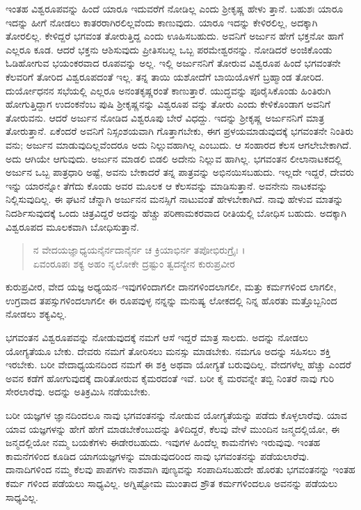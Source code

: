 ಇಂತಹ ವಿಶ್ವರೂಪವನ್ನು ಹಿಂದೆ ಯಾರೂ ಇದುವರೆಗೆ ನೋಡಿಲ್ಲ ಎಂದು ಶ್ರೀಕೃಷ್ಣ ಹೇಳು ತ್ತಾನೆ. ಬಹುಶಃ ಯಾರೂ ಇದನ್ನು ಹೀಗೆ ನೋಡಲು ಕಾತರರಾಗಿರಲಿಲ್ಲವೆಂದು ಕಾಣುವುದು. ಯಾರೂ ಇದನ್ನು ಕೇಳಿರಲಿಲ್ಲ, ಅದಕ್ಕಾಗಿ ತೋರಲಿಲ್ಲ. ಕೇಳಿದ್ದರೆ ಭಗವಂತ ತೋರುತ್ತಿದ್ದ ಎಂದು ಊಹಿಸಬಹುದು. ಅವನಿಗೆ ಅರ್ಜುನ ಹೇಗೆ ಭಕ್ತನೋ ಹಾಗೆ ಎಲ್ಲರೂ ಕೂಡ. ಆದರೆ ಭಕ್ತನು ಆಶಿಸುವುದು ಪ್ರೀತಿಸಬಲ್ಲ ಒಬ್ಬ ಪರಮೇಶ್ವರನನ್ನು. ನೋಡಿದರೆ ಅಂಜಿಕೊಂಡು ಓಡಿಹೋಗುವ ಭಯಂಕರವಾದ ರೂಪವನ್ನು ಅಲ್ಲ. ಇಲ್ಲಿ ಅರ್ಜುನನಿಗೆ ತೋರುವ ವಿಶ್ವರೂಪ ಹಿಂದೆ ಭಗವಂತನೇ ಕೆಲವರಿಗೆ ತೋರಿದ ವಿಶ್ವರೂಪದಂತೆ ಇಲ್ಲ. ತನ್ನ ತಾಯಿ ಯಶೋದೆಗೆ ಬಾಯಿಯೊಳಗೆ ಬ್ರಹ್ಮಾಂಡ ತೋರಿದ. ದುರ್ಯೋಧನನ ಸಭೆಯಲ್ಲಿ ಎಲ್ಲರೂ ಅನಂತಕೃಷ್ಣರಂತೆ ಕಾಣುತ್ತಾರೆ. ಯುದ್ಧವನ್ನು ಪೂರೈಸಿಕೊಂಡು ಹಿಂತಿರುಗಿ ಹೋಗುತ್ತಿದ್ದಾಗ ಉದಂಕನೆಂಬ ಪುಷಿ ಶ್ರೀಕೃಷ್ಣನನ್ನು ವಿಶ್ವರೂಪ ವನ್ನು ತೋರು ಎಂದು ಕೇಳಿಕೊಂಡಾಗ ಅವನಿಗೆ ತೋರುವನು. ಆದರೆ ಅರ್ಜುನ ನೋಡಿದ ವಿಶ್ವರೂಪು ಬೇರೆ ವಿಧದ್ದು. ಇದನ್ನು ಶ್ರೀಕೃಷ್ಣ ಅರ್ಜುನನಿಗೆ ಮಾತ್ರ ತೋರುತ್ತಾನೆ. ಏಕೆಂದರೆ ಅವನಿಗೆ ನಿಸ್ಸಂಶಯವಾಗಿ ಗೊತ್ತಾಗಬೇಕು, ಈಗ ಪ್ರಳಯಮಾಡುವುದಕ್ಕೆ ಭಗವಂತನೇ ನಿಂತಿರು ವನು; ಅರ್ಜುನ ಮಾಡುವುದಿಲ್ಲವೆಂದರೂ ಅದು ನಿಲ್ಲುವಹಾಗಿಲ್ಲ ಎಂಬುದು. ಆ ಸಂಹಾರದ ಕೆಲಸ ಆಗಲೇಬೇಕಾಗಿದೆ. ಅದು ಆಗಿಯೇ ಆಗುವುದು. ಅರ್ಜುನ ಮಾಡಲಿ ಬಿಡಲಿ ಅದೇನು ನಿಲ್ಲುವ ಹಾಗಿಲ್ಲ. ಭಗವಂತನ ಲೀಲಾನಾಟಕದಲ್ಲಿ ಅರ್ಜುನ ಒಬ್ಬ ಪಾತ್ರಧಾರಿ ಅಷ್ಟೆ, ಅವನು ಬೇಕಾದರೆ ತನ್ನ ಪಾತ್ರವನ್ನು ಅಭಿನಯಿಸಬಹುದು. ಇಲ್ಲದೇ ಇದ್ದರೆ, ದೇವರು ಇನ್ನು ಯಾರನ್ನೋ ತೆಗೆದು ಕೊಂಡು ಅವರ ಮೂಲಕ ಆ ಕೆಲಸವನ್ನು ಮಾಡಿಸುತ್ತಾನೆ. ಅವನೇನು ನಾಟಕವನ್ನು ನಿಲ್ಲಿಸುವುದಿಲ್ಲ. ಈ ಘಟನೆ ಚೆನ್ನಾಗಿ ಅರ್ಜುನನ ಮನಸ್ಸಿಗೆ ನಾಟುವಂತೆ ಹೇಳಬೇಕಾಗಿದೆ. ನಾವು ಹೇಳುವ ಮಾತನ್ನು ನಿದರ್ಶಿಸುವುದಕ್ಕೆ ಒಂದು ಚಿತ್ರವಿದ್ದರೆ ಅದನ್ನು ಹೆಚ್ಚು ಪರಿಣಾಮಕರವಾದ ರೀತಿಯಲ್ಲಿ ಬೋಧಿಸ ಬಹುದು. ಅದಕ್ಕಾಗಿ ವಿಶ್ವರೂಪದ ಮೂಲಕವಾಗಿ ಬೋಧಿಸುತ್ತಾನೆ.

\begin{verse}
ನ ವೇದಯಜ್ಞಾಧ್ಯಯನೈರ್ನದಾನೈರ್ನ ಚ ಕ್ರಿಯಾಭಿರ್ನ ತಪೋಭಿರುಗ್ರೈಃ ।\\ಏವಂರೂಪಃ ಶಕ್ಯ ಅಹಂ ನೃಲೋಕೇ ದ್ರಷ್ಟುಂ ತ್ವದನ್ಯೇನ ಕುರುಪ್ರವೀರ 
\end{verse}

{\small ಕುರುಪ್ರವೀರ, ವೇದ ಯಜ್ಞ ಅಧ್ಯಯನ–ಇವುಗಳಿಂದಾಗಲೀ ದಾನಗಳಿಂದಲಾಗಲೀ, ಮತ್ತು ಕರ್ಮಗಳಿಂದ ಲಾಗಲೀ, ಉಗ್ರವಾದ ತಪಸ್ಸುಗಳಿಂದಲಾಗಲೀ ಈ ರೂಪವುಳ್ಳ ನನ್ನನ್ನು ಮನುಷ್ಯ ಲೋಕದಲ್ಲಿ ನಿನ್ನ ಹೊರತು ಮತ್ತೊಬ್ಬನಿಂದ ನೋಡಲು ಶಕ್ಯವಿಲ್ಲ.}

ಭಗವಂತನ ವಿಶ್ವರೂಪವನ್ನು ನೋಡುವುದಕ್ಕೆ ನಮಗೆ ಆಸೆ ಇದ್ದರೆ ಮಾತ್ರ ಸಾಲದು. ಅದನ್ನು ನೋಡಲು ಯೋಗ್ಯತೆಯೂ ಬೇಕು. ದೇವರು ನಮಗೆ ತೋರಿಸಲು ಮನಸ್ಸು ಮಾಡಬೇಕು. ನಮಗೂ ಅದನ್ನು ಸಹಿಸಲು ಶಕ್ತಿ ಇರಬೇಕು. ಬರೀ ವೇದಾಧ್ಯಯನದಿಂದ ನಮಗೆ ಈ ಶಕ್ತಿ ಅಥವಾ ಯೋಗ್ಯತೆ ಬರುವುದಿಲ್ಲ. ವೇದಗಳೆಲ್ಲ ಹೆಚ್ಚು ಎಂದರೆ ಅವನ ಕಡೆಗೆ ಹೋಗುವುದಕ್ಕೆ ದಾರಿತೋರುವ ಕೈಮರದಂತೆ ಇವೆ. ಬರೀ ಕೈ ಮರವನ್ನೇ ತಬ್ಬಿ ನಿಂತರೆ ನಾವು ಗುರಿ ಸೇರಲಾರೆವು. ಅದನ್ನು ಅತಿಕ್ರಮಿಸಿ ನಡೆಯಬೇಕು.

ಬರೀ ಯಜ್ಞಗಳ ಜ್ಞಾನದಿಂದಲೂ ನಾವು ಭಗವಂತನನ್ನು ನೋಡುವ ಯೋಗ್ಯತೆಯನ್ನು ಪಡೆದು ಕೊಳ್ಳಲಾರೆವು. ಯಾವ ಯಾವ ಯಜ್ಞಗಳನ್ನು ಹೇಗೆ ಹೇಗೆ ಮಾಡಬೇಕೆಂಬುದನ್ನು ತಿಳಿದಿದ್ದರೆ, ಕೆಲವು ವೇಳೆ ಮುಂದಿನ ಜನ್ಮದಲ್ಲಿಯೋ, ಈ ಜನ್ಮದಲ್ಲಿಯೋ ನಮ್ಮ ಬಯಕೆಗಳು ಈಡೇರಬಹುದು. ಇವುಗಳ ಹಿಂದೆಲ್ಲ ಕಾಮನೆಗಳು ಇರುವುವು. ಇಂತಹ ಕಾಮನೆಗಳಿಂದ ಕೂಡಿದ ಯಾಗಯಜ್ಞಗಳನ್ನು ಮಾಡುವುದರಿಂದ ನಾವು ಭಗವಂತನನ್ನು ಪಡೆಯಲಾರೆವು. ದಾನಾದಿಗಳಿಂದ ನಮ್ಮ ಕೆಲವು ಪಾಪಗಳು ನಾಶವಾಗಿ ಪುಣ್ಯವನ್ನು ಸಂಪಾದಿಸಬಹುದೇ ಹೊರತು ಭಗವಂತನನ್ನು ಇಂತಹ ಕರ್ಮ ಗಳಿಂದ ಪಡೆಯಲು ಸಾಧ್ಯವಿಲ್ಲ. ಅಗ್ನಿಷ್ಟೋಮ ಮುಂತಾದ ಶ್ರೌತ ಕರ್ಮಗಳಿಂದಲೂ ಅವನನ್ನು ಪಡೆಯಲು ಸಾಧ್ಯವಿಲ್ಲ.

